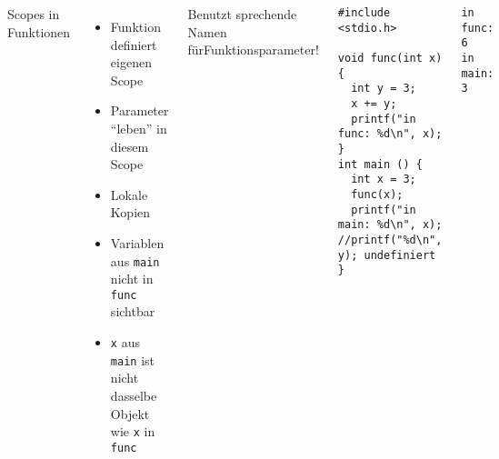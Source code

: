 \begin{frame}[fragile]%
%
\begin{columns}[b]
\begin{Large}
\vspace{10pt}
Scopes in Funktionen
\vspace{6pt}
\end{Large}
\begin{itemize}
\item Funktion definiert eigenen Scope
\item Parameter \enquote{leben} in diesem Scope
\item Lokale Kopien
\item Variablen aus \texttt{main} nicht in \texttt{func} sichtbar
\item \texttt{x} aus \texttt{main} ist nicht dasselbe Objekt wie \texttt{x} in \texttt{func}
\end{itemize}
%
\begin{hintbox}
Benutzt sprechende Namen für\newline Funktionsparameter!
\end{hintbox}
%
\begin{codebox}
\begin{verbatim}
#include <stdio.h>

void func(int x) {
  int y = 3;
  x += y;
  printf("in func: %d\n", x);
}
int main () {
  int x = 3;   
  func(x);   
  printf("in main: %d\n", x);
//printf("%d\n", y); undefiniert
}
\end{verbatim}
\end{codebox}
%
\begin{cmdbox}[Ausgabe]
\begin{verbatim}
in func: 6
in main: 3
\end{verbatim}
\end{cmdbox}
\end{columns}
%
\end{frame}


